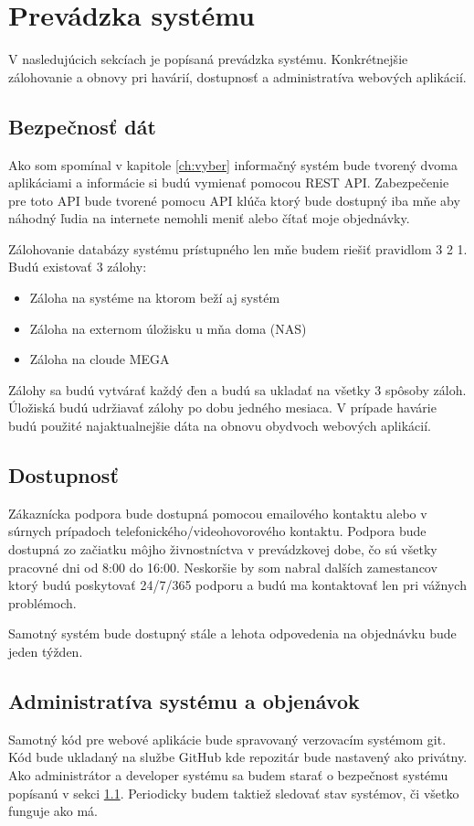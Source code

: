 \chapter{Prevádzka systému}

V nasledujúcich sekcíach je popísaná prevádzka systému. Konkrétnejšie zálohovanie a obnovy pri havárií, dostupnosť a administratíva webových aplikácií.

\section{Bezpečnosť dát}
\label{sec}
Ako som spomínal v kapitole \ref{ch:vyber} informačný systém bude tvorený dvoma aplikáciami a informácie si budú vymienať pomocou REST API. Zabezpečenie pre toto API bude tvorené pomocu API klúča ktorý bude dostupný iba mňe aby náhodný ľudia na internete nemohli meniť alebo čítať moje objednávky.

Zálohovanie databázy systému prístupného len mňe budem riešiť pravidlom 3 2 1. Budú existovať 3 zálohy:
\begin{itemize}
  \item Záloha na systéme na ktorom beží aj systém
  \item Záloha na externom úložisku u mňa doma (NAS)
  \item Záloha na cloude MEGA
\end{itemize}
Zálohy sa budú vytvárať každý ďen a budú sa ukladať na všetky 3 spôsoby záloh. Úložiská budú udržiavať zálohy po dobu jedného mesiaca. V prípade havárie budú použité najaktualnejšie dáta na obnovu obydvoch webových aplikácií.


\section{Dostupnosť}

Zákaznícka podpora bude dostupná pomocou emailového kontaktu alebo v súrnych prípadoch telefonického/videohovorového kontaktu. Podpora bude dostupná zo začiatku môjho živnostníctva v prevádzkovej dobe, čo sú všetky pracovné dni od 8:00 do 16:00. Neskoršie by som nabral dalších zamestancov ktorý budú poskytovať 24/7/365 podporu a budú ma kontaktovať len pri vážnych problémoch.

Samotný systém bude dostupný stále a lehota odpovedenia na objednávku bude jeden týžden.

\section{Administratíva systému a objenávok}

Samotný kód pre webové aplikácie bude spravovaný verzovacím systémom git. Kód bude ukladaný na službe GitHub kde repozitár bude nastavený ako privátny. Ako administrátor a developer systému sa budem starať o bezpečnost systému popísanú v sekci \ref{sec}. Periodicky budem taktiež sledovať stav systémov, či všetko funguje ako má.

